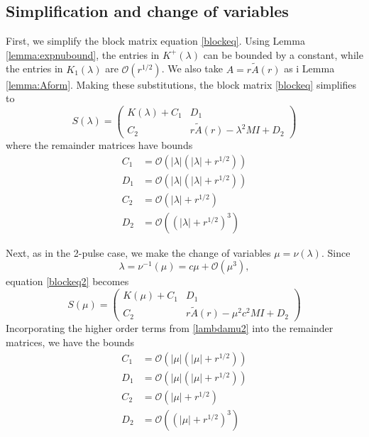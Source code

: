 \documentclass[thesis.tex]{subfiles}
\begin{document}
\subsection{Simplification and change of variables}

First, we simplify the block matrix equation \cref{blockeq}. Using Lemma \ref{lemma:expnubound}, the entries in $K^+(\lambda)$ can be bounded by a constant, while the entries in $K_1(\lambda)$ are $\mathcal{O}(r^{1/2})$. We also take $A = r \tilde{A}(r)$ as i Lemma \ref{lemma:Aform}. Making these substitutions, the block matrix \cref{blockeq} simplifies to 
\begin{equation}\label{blockeq2}
S(\lambda) = \begin{pmatrix}
K(\lambda) + C_1 & D_1 \\
C_2 & r \tilde{A}(r) - \lambda^2 M I + D_2
\end{pmatrix}
\end{equation}
where the remainder matrices have bounds
\begin{equation*}
\begin{aligned}
C_1 &= \mathcal{O}(|\lambda|(|\lambda| + r^{1/2})) \\
D_1 &= \mathcal{O}(|\lambda|(|\lambda| + r^{1/2})) \\
C_2 &= \mathcal{O}(|\lambda| + r^{1/2}) \\
D_2 &= \mathcal{O}((|\lambda| + r^{1/2})^3) 
\end{aligned}
\end{equation*}

Next, as in the 2-pulse case, we make the change of variables $\mu = \nu(\lambda)$. Since
\begin{equation}\label{lambdamu2}
\lambda = \nu^{-1}(\mu) = c \mu + \mathcal{O}(\mu^3),
\end{equation}
equation \cref{blockeq2} becomes
\begin{equation}\label{blockeq2}
S(\mu) = \begin{pmatrix}
K(\mu) + C_1 & D_1 \\
C_2 & r \tilde{A}(r) - \mu^2 c^2 M I + D_2
\end{pmatrix}
\end{equation}
Incorporating the higher order terms from \cref{lambdamu2} into the remainder matrices, we have the bounds
\begin{equation*}\label{remSbounds}
\begin{aligned}
C_1 &= \mathcal{O}(|\mu|(|\mu| + r^{1/2})) \\
D_1 &= \mathcal{O}(|\mu|(|\mu| + r^{1/2})) \\
C_2 &= \mathcal{O}(|\mu| + r^{1/2}) \\
D_2 &= \mathcal{O}((|\mu| + r^{1/2})^3) 
\end{aligned}
\end{equation*}
\end{document}
